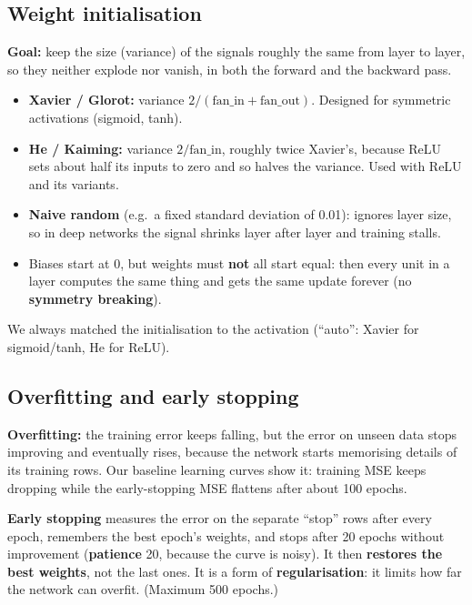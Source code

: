 \documentclass[11pt,a4paper]{article}
\begin{document}
\subsection{Weight initialisation}
\textbf{Goal:} keep the size (variance) of the signals roughly the same from layer to layer, so they neither explode nor
vanish, in both the forward and the backward pass.
\begin{itemize}
  \item \textbf{Xavier / Glorot:} variance $2 / (\text{fan\_in} + \text{fan\_out})$. Designed for symmetric activations
        (sigmoid, tanh).
  \item \textbf{He / Kaiming:} variance $2 / \text{fan\_in}$, roughly twice Xavier's, because ReLU sets about half its
        inputs to zero and so halves the variance. Used with ReLU and its variants.
  \item \textbf{Naive random} (e.g.\ a fixed standard deviation of 0.01): ignores layer size, so in deep networks the
        signal shrinks layer after layer and training stalls.
  \item Biases start at 0, but weights must \textbf{not} all start equal: then every unit in a layer computes the same
        thing and gets the same update forever (no \textbf{symmetry breaking}).
\end{itemize}
We always matched the initialisation to the activation (``auto'': Xavier for sigmoid/tanh, He for ReLU).

\subsection{Overfitting and early stopping}
\label{sec:es}
\textbf{Overfitting:} the training error keeps falling, but the error on unseen data stops improving and eventually rises,
because the network starts memorising details of its training rows. Our baseline learning curves show it: training MSE
keeps dropping while the early-stopping MSE flattens after about 100 epochs.

\textbf{Early stopping} measures the error on the separate ``stop'' rows after every epoch, remembers the best epoch's
weights, and stops after 20 epochs without improvement (\textbf{patience} 20, because the curve is noisy). It then
\textbf{restores the best weights}, not the last ones. It is a form of \textbf{regularisation}: it limits how far the
network can overfit. (Maximum 500 epochs.)
\end{document}
